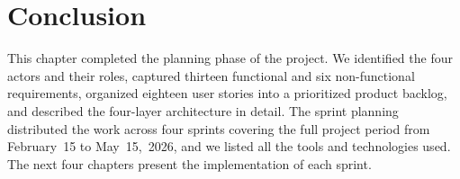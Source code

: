 \section{Conclusion}

This chapter completed the planning phase of the project. We identified the four actors and their roles, captured thirteen functional and six non-functional requirements, organized eighteen user stories into a prioritized product backlog, and described the four-layer architecture in detail. The sprint planning distributed the work across four sprints covering the full project period from February~15 to May~15,~2026, and we listed all the tools and technologies used. The next four chapters present the implementation of each sprint.

